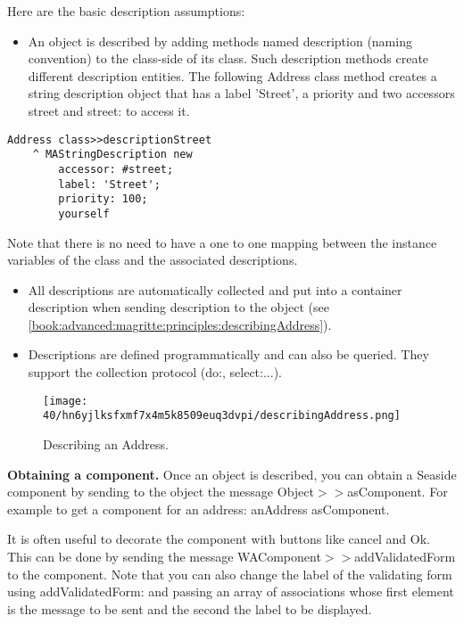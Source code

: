 \documentclass[a4paper,10pt,twoside]{book}
\newcommand{\ct}[1]{{\small\ttfamily\textup{#1}}}
\begin{document}
Here are the basic description assumptions:

\begin{itemize}
\item  An object is described by adding methods named \ct{description} (naming convention) to the class-side of its class. Such description methods create different description entities. The following \ct{Address} class method creates a string description object that has a label 'Street', a priority and two accessors street and street: to access it.
\end{itemize}

\begin{lstlisting}
Address class>>descriptionStreet
    ^ MAStringDescription new
        accessor: #street;
        label: 'Street';
        priority: 100;
        yourself
\end{lstlisting}

Note that there is no need to have a one to one mapping between the instance variables of the class and the associated descriptions.

\begin{itemize}
\item  All descriptions are automatically collected and put into a container description when sending \ct{description} to  the object (see \autoref{book:advanced:magritte:principles:describingAddress}).
\item  Descriptions are defined programmatically and can also be queried. They support the collection protocol (\ct{do:},  \ct{select:}...).
\end{itemize}

\begin{figure}[h!tbp]
	\begin{center}
		\texttt{[image: 40/hn6yjlksfxmf7x4m5k8509euq3dvpi/describingAddress.png]}
		\caption{Describing an Address.\label{book:advanced:magritte:principles:describingAddress}}
	\end{center}
\end{figure}


\textbf{Obtaining a component.} Once an object is described, you can obtain a Seaside component by sending to the object the message  \ct{Object$>$$>$asComponent}. For example to get a component for an address: \ct{anAddress asComponent}.

It is often useful to decorate the component with buttons like cancel and Ok. This can be done by sending the message  \ct{WAComponent$>$$>$addValidatedForm} to the component. Note that you can also change the label of the validating form using \ct{addValidatedForm:} and passing an array of associations whose first element is the message to be sent and the second the label to be displayed.
\end{document}
